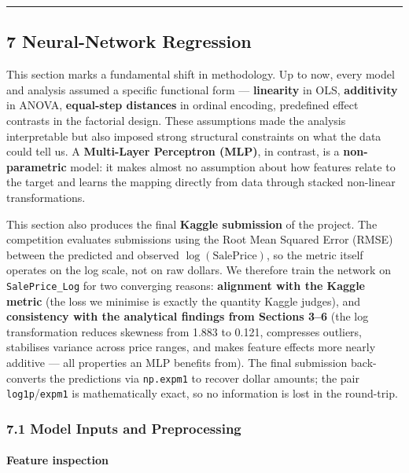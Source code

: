 \begin{center}\rule{0.5\linewidth}{0.5pt}\end{center}

\subsection{7 Neural-Network
Regression}\label{neural-network-regression}

This section marks a fundamental shift in methodology. Up to now, every
model and analysis assumed a specific functional form ---
\textbf{linearity} in OLS, \textbf{additivity} in ANOVA,
\textbf{equal-step distances} in ordinal encoding, predefined effect
contrasts in the factorial design. These assumptions made the analysis
interpretable but also imposed strong structural constraints on what the
data could tell us. A \textbf{Multi-Layer Perceptron (MLP)}, in
contrast, is a \textbf{non-parametric} model: it makes almost no
assumption about how features relate to the target and learns the
mapping directly from data through stacked non-linear transformations.

This section also produces the final \textbf{Kaggle submission} of the
project. The competition evaluates submissions using the Root Mean
Squared Error (RMSE) between the predicted and observed
\(\log(\text{SalePrice})\), so the metric itself operates on the log
scale, not on raw dollars. We therefore train the network on
\texttt{SalePrice\_Log} for two converging reasons: \textbf{alignment
with the Kaggle metric} (the loss we minimise is exactly the quantity
Kaggle judges), and \textbf{consistency with the analytical findings
from Sections 3--6} (the log transformation reduces skewness from 1.883
to 0.121, compresses outliers, stabilises variance across price ranges,
and makes feature effects more nearly additive --- all properties an MLP
benefits from). The final submission back-converts the predictions via
\texttt{np.expm1} to recover dollar amounts; the pair
\texttt{log1p}/\texttt{expm1} is mathematically exact, so no information
is lost in the round-trip.

\subsubsection{7.1 Model Inputs and
Preprocessing}\label{model-inputs-and-preprocessing}

\paragraph{Feature inspection}\label{feature-inspection}

